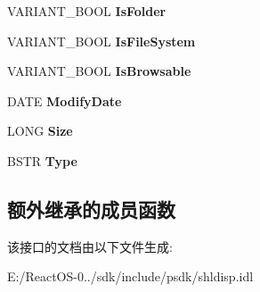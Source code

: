 \begin{DoxyCompactItemize}
\item 
\mbox{\label{interface_shell32_1_1_folder_item_a52715be5104c50c9ed3220ad2684e00a}} 
V\+A\+R\+I\+A\+N\+T\+\_\+\+B\+O\+OL {\bfseries Is\+Folder}
\item 
\mbox{\label{interface_shell32_1_1_folder_item_ac22804dda8dc66883b0671f3d3ff616d}} 
V\+A\+R\+I\+A\+N\+T\+\_\+\+B\+O\+OL {\bfseries Is\+File\+System}
\item 
\mbox{\label{interface_shell32_1_1_folder_item_aec152bf572214576973914b4ede99a45}} 
V\+A\+R\+I\+A\+N\+T\+\_\+\+B\+O\+OL {\bfseries Is\+Browsable}
\item 
\mbox{\label{interface_shell32_1_1_folder_item_afee3d712a12cf51bae904c29a041d0e1}} 
D\+A\+TE {\bfseries Modify\+Date}
\item 
\mbox{\label{interface_shell32_1_1_folder_item_afba7273539f129c077bddcda71e63a90}} 
L\+O\+NG {\bfseries Size}
\item 
\mbox{\label{interface_shell32_1_1_folder_item_a09ebc5b1468c12db0a0163513ddf1fa4}} 
B\+S\+TR {\bfseries Type}
\end{DoxyCompactItemize}
\subsection*{额外继承的成员函数}


该接口的文档由以下文件生成\+:\begin{DoxyCompactItemize}
\item 
E\+:/\+React\+O\+S-\/0../sdk/include/psdk/shldisp.\+idl\end{DoxyCompactItemize}
